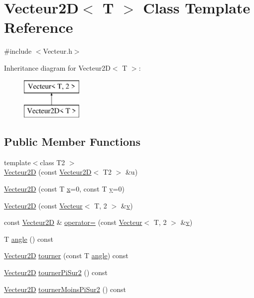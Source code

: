 \hypertarget{class_vecteur2_d}{\section{Vecteur2\-D$<$ T $>$ Class Template Reference}
\label{class_vecteur2_d}
}


{\ttfamily \#include $<$Vecteur.\-h$>$}

Inheritance diagram for Vecteur2\-D$<$ T $>$\-:\begin{figure}[H]
\begin{center}
\leavevmode
\includegraphics[height=2.000000cm]{class_vecteur2_d}
\end{center}
\end{figure}
\subsection*{Public Member Functions}
\begin{DoxyCompactItemize}
\item 
{\footnotesize template$<$class T2 $>$ }\\\hyperlink{class_vecteur2_d_aaeed114a03440778eafabd7d97613940}{Vecteur2\-D} (const \hyperlink{class_vecteur2_d}{Vecteur2\-D}$<$ T2 $>$ \&u)
\item 
\hyperlink{class_vecteur2_d_a8445fc164933218135a7367d331c9420}{Vecteur2\-D} (const T \hyperlink{glew_8h_ad77deca22f617d3f0e0eb786445689fc}{x}=0, const T \hyperlink{glew_8h_a9298c7ad619074f5285b32c6b72bfdea}{y}=0)
\item 
\hyperlink{class_vecteur2_d_ad8fbdbe8868c6d2c2b4ba595d97d351c}{Vecteur2\-D} (const \hyperlink{class_vecteur}{Vecteur}$<$ T, 2 $>$ \&\hyperlink{glew_8h_a6509431814422c215a65946289dd98b8}{v})
\item 
const \hyperlink{class_vecteur2_d}{Vecteur2\-D} \& \hyperlink{class_vecteur2_d_a255ae104ab5cc951f60c4d8fa8f0f815}{operator=} (const \hyperlink{class_vecteur}{Vecteur}$<$ T, 2 $>$ \&\hyperlink{glew_8h_a6509431814422c215a65946289dd98b8}{v})
\item 
T \hyperlink{class_vecteur2_d_ae61a247f0e5865c44acfdebe2c2b5576}{angle} () const 
\item 
\hyperlink{class_vecteur2_d}{Vecteur2\-D} \hyperlink{class_vecteur2_d_ab08bc3a39110d9af846244981b5e4253}{tourner} (const T \hyperlink{glew_8h_a6d7a98b0d979b9411a4344a98a7a6122}{angle}) const 
\item 
\hyperlink{class_vecteur2_d}{Vecteur2\-D} \hyperlink{class_vecteur2_d_aced7fc87df9102a148d926632841aa0d}{tourner\-Pi\-Sur2} () const 
\item 
\hyperlink{class_vecteur2_d}{Vecteur2\-D} \hyperlink{class_vecteur2_d_a7c798458503ff4f7ccff9b32ccc77b77}{tourner\-Moins\-Pi\-Sur2} () const 
\end{DoxyCompactItemize}
